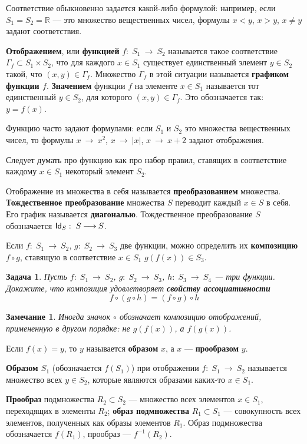 \documentclass[12pt]{book}
\newcommand{\arrow}{{\:\longrightarrow\:}}
\def\Id{{\operatorname{\sf Id}}}
\def\R{{\mathbb R}}
\theoremstyle{upshape}
\newtheorem{zadacha}{Задача}[chapter]
\theoremstyle{generic}
\newtheorem{remark}[teorema]{Замечание}
\def\замечание{\begin{remark}}
\def\еза{\end{remark}}
\theoremstyle{upshapenonumber}
\newcommand{\следствие}{%
     \refstepcounter{teorema}
     {\noindent\bf Следствие \thechapter.\arabic{teorema}:\ }}
\newcommand{\пример}{%
     \refstepcounter{teorema}
     {\noindent\bf Пример \thechapter.\arabic{teorema}:\ }}
\newcommand{\лемма}{%
     \refstepcounter{teorema}
     {\noindent\bf Лемма \thechapter.\arabic{teorema}:\ }}
\newcommand{\теорема}{%
     \refstepcounter{teorema}
     {\noindent\bf Теорема \thechapter.\arabic{teorema}:\ }}
\newcommand{\утверждение}{%
     \refstepcounter{teorema}
     {\noindent\bf Утверждение \thechapter.\arabic{teorema}:\ }}
\def\бф{\bf}
\def\ем{\em}
\def\задача{\begin{zadacha}}
\def\ез{\end{zadacha}}
\def\еу{\end{ukazanie}}
\def\ео{\end{opredelenie}}
\def\енум{\begin{enumerate}}
\def\ее{\end{enumerate}}
\begin{document}
Соответствие обыкновенно задается 
какой-либо формулой: например, если 
$S_1=S_2=\R$ --- это множество вещественных чисел,
формулы $x< y$, $x> y$, $x\neq y$ 
задают соответствия. 

{\бф Отображением}, или {\бф функцией}
$f:\; S_1 \arrow S_2$ называется такое 
соответствие $\Gamma_f\subset S_1 \times S_2$, 
что для каждого $x\in S_1$ существует единственный
элемент $y\in S_2$ такой, что $(x, y) \in \Gamma_f$.
Множество $\Gamma_f$ в этой ситуации называется
{\бф графиком функции $f$}. {\бф Значением} функции
$f$ на элементе $x\in S_1$ называется
тот единственный $y\in S_2$, для
которого $(x, y) \in \Gamma_f$.
Это обозначается так: $y = f(x)$.

Функцию часто задают формулами: если 
$S_1$ и $S_2$ это множества вещественных чисел,
то формулы $x\arrow x^2$, $x\arrow |x|$,
$x\arrow x+2$ задают отображения.

Следует думать про функцию как про набор
правил, ставящих в соответствие каждому 
$x\in S_1$ некоторый элемент $S_2$.

Отображение из множества в себя называется
{\бф преобразованием} множества. {\бф Тождественное
преобразование} множества $S$ переводит
каждый $x\in S$ в себя. Его график называется
{\бф диагональю}. Тождественное преобразование
$S$ обозначается $\Id_S:\; S \arrow S$.

Если $f:\; S_1 \arrow S_2$, $g:\; S_2 \arrow S_3$
две функции, можно определить их {\бф композицию}
$f\circ g$, ставящую в соответствие $x \in S_1$
$g(f(x))\in S_3$. 

\задача
Пусть $f:\; S_1 \arrow S_2$, $g:\; S_2 \arrow S_3$,
$h:\; S_3 \arrow S_4$ --- три функции. Докажите,
что композиция удовлетворяет {\бф свойству ассоциативности}
\[ f\circ (g\circ h) = (f\circ g)\circ h
\]
\ез

\замечание
Иногда значок $\circ$ обозначает
композицию отображений, примененную в другом порядке:
не $g(f(x))$, а $f(g(x))$.
\еза

Если $f(x)=y$, то $y$ называется {\бф образом}
$x$, а $x$ --- {\бф прообразом} $y$. 

{\бф Образом $S_1$} (обозначается $f(S_1)$)
при отображении $f:\; S_1 \arrow S_2$ 
называется множество всех $y\in S_2$,
которые являются образами каких-то $x\in S_1$.

{\bf Прообраз} подмножества $R_2\subset S_2$ --- 
множество всех элементов $x\in S_1$, переходящих
в элементы $R_2$; {\бф образ подмножества} $R_1\subset S_1$ --- 
совокупность всех элементов, полученных как образы
элементов $R_1$. Образ подмножества обозначается
$f(R_1)$, прообраз --- $f^{-1}(R_2)$.
\end{document}
